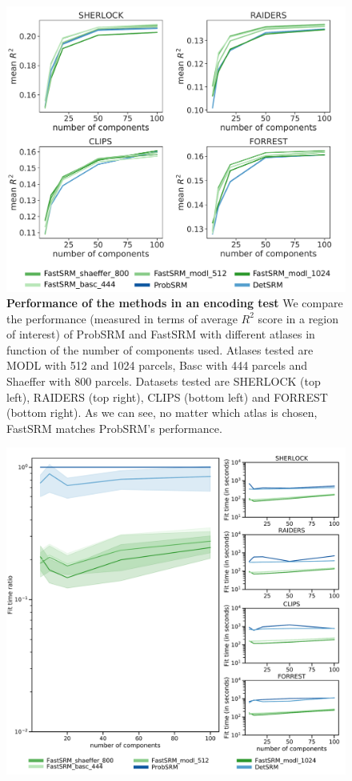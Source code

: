\documentclass{report}
\begin{document}
{\begin{figure}
\centering
\includegraphics[scale=0.34]{figures/srm/perfs.pdf}
\caption{\textbf{Performance of the methods in an encoding test} We compare the performance (measured in terms of average $R^2$ score in a region of interest) of ProbSRM and FastSRM with different atlases in function of the number of components used. Atlases tested are MODL with 512 and 1024 parcels, Basc with 444 parcels and Shaeffer with 800 parcels. Datasets tested are SHERLOCK (top left), RAIDERS (top right), CLIPS (bottom left) and FORREST (bottom right). 
As we can see, no matter which atlas is chosen, FastSRM matches ProbSRM's performance.}
\label{fig:mean_r2_score}
\end{figure}

\begin{figure}
\centering
\includegraphics[scale=0.33]{figures/srm/fit_time.pdf}


\end{figure}}
\end{document}
